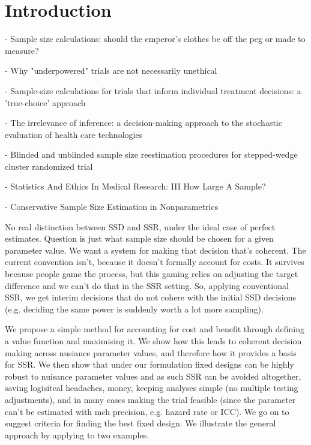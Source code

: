 \documentclass[sagev]{sagej}
\begin{document}

\maketitle



\section{Introduction}\label{sec:intro}

\cite{Norman2012} - Sample size calculations: should the emperor's clothes be off the peg or made to measure?

\cite{Edwards1997} - Why "underpowered" trials are not necessarily unethical

\cite{Girling2007} - Sample-size calculations for trials that inform individual treatment decisions: a 'true-choice' approach

\cite{Claxton1999} - The irrelevance of inference: a decision-making approach to the stochastic evaluation of health care technologies

\cite{Grayling2018} - Blinded and unblinded sample size reestimation procedures for stepped-wedge cluster randomized trial

\cite{Altman1980} - Statistics And Ethics In Medical Research: III How Large A Sample?

\cite{DeMartini2010} - Conservative Sample Size Estimation in Nonparametrics



No real distinction between SSD and SSR, under the ideal case of perfect estimates. Question is just what sample size should be chosen for a given parameter value. We want a system for making that decision that's coherent. The current convention isn't, because it doesn't formally account for costs. It survives because people game the process, but this gaming relies on adjusting the target difference and we can't do that in the SSR setting. So, applying conventional SSR, we get interim decisions that do not cohere with the initial SSD decisions (e.g. deciding the same power is suddenly worth a lot more sampling).

We propose a simple method for accounting for cost and benefit through defining a value function and maximising it. We show how this leads to coherent decision making across nusiance parameter values, and therefore how it provides a basis for SSR. We then show that under our formulation fixed designs can be highly robust to nuisance parameter values and as such SSR can be avoided altogether, saving logisitcal headaches, money, keeping analyses simple (no multiple testing adjustments), and in many cases making the trial feasible (since the parameter can't be estimated with mch precision, e.g. hazard rate or ICC). We go on to suggest criteria for finding the best fixed design. We illustrate the general approach by applying to two examples.
\end{document}
